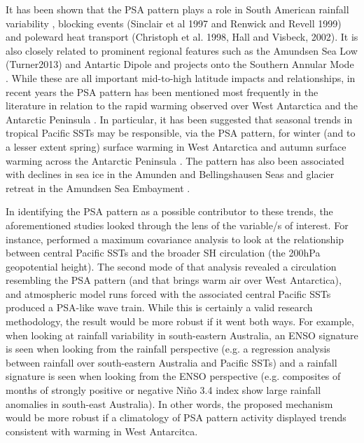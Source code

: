 It has been shown that the PSA pattern plays a role in South American rainfall variability \citep{Mo2001}, blocking events (Sinclair et al 1997 and Renwick and Revell 1999) and poleward heat transport (Christoph et al. 1998, Hall and Visbeck, 2002). It is also closely related to prominent regional features such as the Amundsen Sea Low (Turner2013) and Antartic Dipole \citep{Yuan2001} and projects onto the Southern Annular Mode \citep{Ding2012}. While these are all important mid-to-high latitude impacts and relationships, in recent years the PSA pattern has been mentioned most frequently in the literature in relation to the rapid warming observed over West Antarctica and the Antarctic Peninsula \citep{Nicolas2014}. In particular, it has been suggested that seasonal trends in tropical Pacific SSTs may be responsible, via the PSA pattern, for winter (and to a lesser extent spring) surface warming in West Antarctica \citep{Ding2011} and autumn surface warming across the Antarctic Peninsula \citep{Ding2013}. The pattern has also been associated with declines in sea ice in the Amunden and Bellingshausen Seas \citep{Schneider2012} and glacier retreat in the Amundsen Sea Embayment \citep{Steig2012}.

In identifying the PSA pattern as a possible contributor to these trends, the aforementioned studies looked through the lens of the variable/s of interest. For instance, \citet{Ding2011} performed a maximum covariance analysis to look at the relationship between central Pacific SSTs and the broader SH circulation (the 200hPa geopotential height). The second mode of that analysis revealed a circulation resembling the PSA pattern (and that brings warm air over West Antarctica), and atmospheric model runs forced with the associated central Pacific SSTs produced a PSA-like wave train. While this is certainly a valid research methodology, the result would be more robust if it went both ways. For example, when looking at rainfall variability in south-eastern Australia, an ENSO signature is seen when looking from the rainfall perspective (e.g. a regression analysis between rainfall over south-eastern Australia and Pacific SSTs) and a rainfall signature is seen when looking from the ENSO perspective (e.g. composites of months of strongly positive or negative Ni\~{n}o 3.4 index show large rainfall anomalies in south-east Australia). In other words, the proposed mechanism would be more robust if a climatology of PSA pattern activity displayed trends consistent with warming in West Antarcitca.

